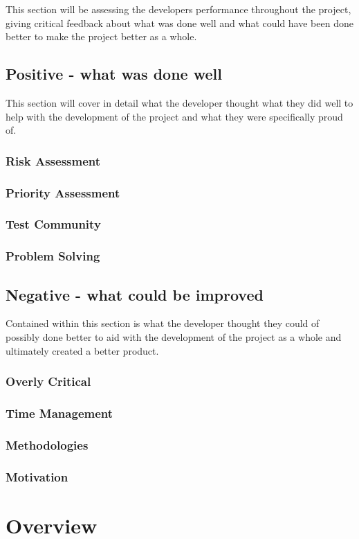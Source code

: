 This section will be assessing the developers performance throughout the project, giving critical feedback about what was done well and what could have been done better to make the project better as a whole.

\subsection{Positive - what was done well}

This section will cover in detail what the developer thought what they did well to help with the development of the project and what they were specifically proud of.

\subsubsection{Risk Assessment}

\subsubsection{Priority Assessment}

\subsubsection{Test Community}

\subsubsection{Problem Solving}


\subsection{Negative - what could be improved}

Contained within this section is what the developer thought they could of possibly done better to aid with the development of the project as a whole and ultimately created a better product. 

\subsubsection{Overly Critical}

\subsubsection{Time Management}

\subsubsection{Methodologies}

\subsubsection{Motivation}


\section{Overview}

